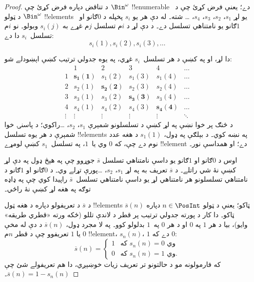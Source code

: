 \documentclass[../../../include/open-logic-section]{subfiles}
\begin{document}
\begin{proof}
د تناقض دپاره فرض کړئ چې $\Bin^\omega$ !!{enumerable} دے؛ يعنې
فرض کړئ چې د~$\Bin^\omega$ د ټولو !!{element}s يو لړ $s_{1}$،
$s_{2}$، $s_{3}$، $s_{4}$، \dots{} شته۔ له دې هر يو $s_i$ پخپله
د $0$ګانو او~$1$ګانو يو نامتناهي تسلسل دے۔ د دې لړ د $i$م تسلسل
$j$م غړے به $s_i(j)$ وبولو۔ نو $i$م تسلسل~$s_i$ دا دے:
\[
s_i(1), s_i(2), s_i(3), \dots
\]

دا لړ، او په کښې د هر تسلسل~$s_i$ غړي، په يوه جدولي ترتيب کښې
اېښودلے شو:
\[
\begin{array}{c|c|c|c|c|c}
& 1 & 2 & 3 & 4 & \dots \\\hline
1 & \mathbf{s_{1}(1)} & s_{1}(2) & s_{1}(3) & s_1(4) & \dots \\\hline
2 & s_{2}(1)& \mathbf{s_{2}(2)} & s_2(3) & s_2(4) & \dots \\\hline
3 & s_{3}(1)& s_{3}(2) & \mathbf{s_3(3)} & s_3(4) & \dots \\\hline
4 & s_{4}(1)& s_{4}(2) & s_4(3) & \mathbf{s_4(4)} & \dots \\\hline
\vdots & \vdots & \vdots & \vdots & \vdots & \mathbf{\ddots}
\end{array}
\]
د څنګ پر خوا نښې په لړ کښې د تسلسلونو شمېرې $s_1$، $s_2$،
\dots راکوي؛ د پاسنۍ خوا شمېرې د هر يوه تسلسل !!{element}s په
نښه کوي۔ د بېلګې په ډول، $s_{1}(1)$ د هغه عدد نوم دے چې، که $0$
وي يا~$1$، په تسلسل~$s_{1}$ کښې لومړے !!{element} دے؛ او همداسې
نور۔

اوس د $0$ګانو او $1$ګانو يو داسې نامتناهي تسلسل
$\overline{s}$ جوړوو چې په هېڅ ډول په دې لړ کښې نۀ شي راتلے۔ د
$\overline{s}$ تعريف به په لړ $s_1$، $s_2$، \dots پورې تړلے وي۔
د $0$ګانو او $1$ګانو د نامتناهي تسلسلونو هر نامتناهي لړ يو داسې
نامتناهي تسلسل~$\overline{s}$ راپيدا کوي چې په ډاډه توګه په هغه
لړ کښې نۀ راځي۔

د $\overline{s}$ د تعريفولو دپاره د هغه ټول !!{element}s ټاکو؛
يعنې د ټولو $n \in \PosInt$ دپاره $\overline{s}(n)$ ټاکو۔ دا کار
د پورته جدولي ترتيب پر قطر د لاندې تللو (ځکه ورته «قطري طريقه»
وايو)، بيا د هر $1$ په $0$ او د هر $0$ په~$1$ بدلولو کوو۔ په لا
مجرد ډول، $\overline{s}(n)$ د دې له مخې $0$ يا $1$ تعريفوو چې د
قطر $n$م !!{element}، $s_n(n)$، $1$ دے که $0$:
\[
\overline{s}(n) =
\begin{cases}
1 & \text{که $s_{n}(n) = 0$ وي}\\
0 & \text{که $s_{n}(n) = 1$ وي}.
\end{cases}
\]
که فارمولونه مو د حالتونو تر تعريف زيات خوښېږي، دا هم تعريفولے
شئ چې $\overline{s}(n) = 1 - s_n(n)$۔


\end{proof}
\end{document}
